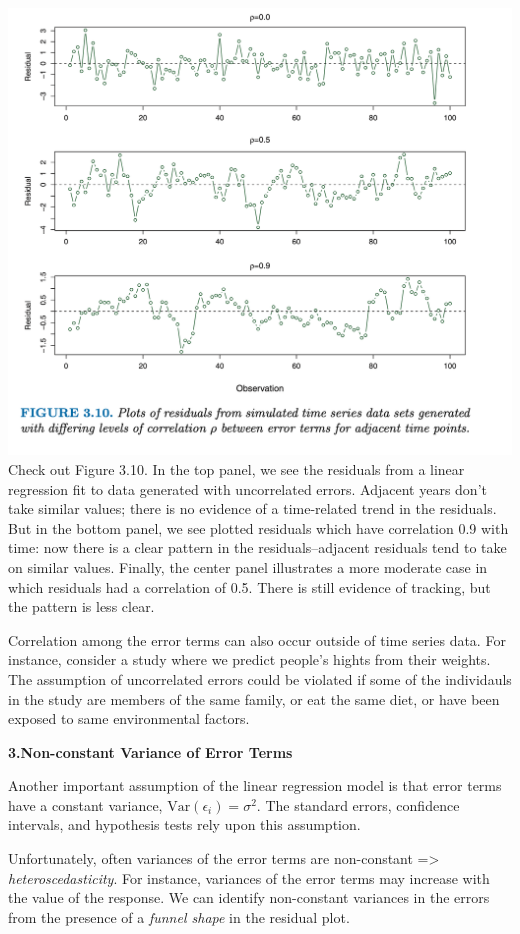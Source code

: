 \documentclass[
  letterpaper,
  DIV=11,
  numbers=noendperiod]{scrreprt}
\begin{document}
\includegraphics{fig3.10.png} Check out Figure 3.10. In the top panel,
we see the residuals from a linear regression fit to data generated with
uncorrelated errors. Adjacent years don't take similar values; there is
no evidence of a time-related trend in the residuals. But in the bottom
panel, we see plotted residuals which have correlation 0.9 with time:
now there is a clear pattern in the residuals--adjacent residuals tend
to take on similar values. Finally, the center panel illustrates a more
moderate case in which residuals had a correlation of 0.5. There is
still evidence of tracking, but the pattern is less clear.

Correlation among the error terms can also occur outside of time series
data. For instance, consider a study where we predict people's hights
from their weights. The assumption of uncorrelated errors could be
violated if some of the individauls in the study are members of the same
family, or eat the same diet, or have been exposed to same environmental
factors.

\textbf{3.Non-constant Variance of Error Terms}

Another important assumption of the linear regression model is that
error terms have a constant variance,
\(\text{Var}(\epsilon_i) = \sigma^2\). The standard errors, confidence
intervals, and hypothesis tests rely upon this assumption.

Unfortunately, often variances of the error terms are non-constant
=\textgreater{} \emph{heteroscedasticity}. For instance, variances of
the error terms may increase with the value of the response. We can
identify non-constant variances in the errors from the presence of a
\emph{funnel shape} in the residual plot.
\end{document}
